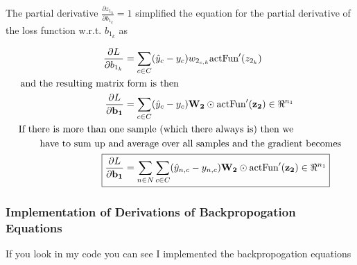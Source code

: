 \documentclass[]{article}
\begin{document}
The partial derivative  $\frac{\partial z_{1_k}} {\partial b_{1_{k}} } =1$ simplified the equation for the partial derivative of the loss function w.r.t. $b_{1_{k}} $ as

\begin{align*}
\frac{\partial L}{\partial b_{1_{k}}} &= \sum_{c\in C}( \hat{y}_c - y_c) w_{2_{c,k}}\text{actFun}'(z_{2_k})\\
\text{and the resulting matrix} &\text{ form is then}\\
\frac{\partial L}{\partial \mathbf{b_1}} &= \sum_{c\in C}( \hat{y}_c - y_c) \mathbf{W_2}  \odot \text{actFun}'(\mathbf{z_2})\in \Re^{n_1} \\
\text{If there is more than one}&\text{ sample (which there always is) then we}\\
\text{have to sum up and}& \text{ average over all samples and the gradient becomes}\\
\Aboxed{ \frac{\partial L}{\partial \mathbf{b_1}} &= \sum_{n\in N} \sum_{c\in C}( \hat{y}_{n,c} - y_{n,c}) \mathbf{W_2}  \odot \text{actFun}'(\mathbf{z_2})\in \Re^{n_1} } \\
\end{align*}

\subsubsection{Implementation of Derivations of Backpropogation Equations}
If you look in my code you can see I implemented the backpropogation equations
\end{document}
